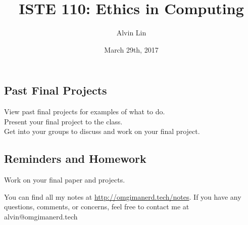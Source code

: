 \documentclass[letterpaper, 12pt]{article}
\title{ISTE 110: Ethics in Computing}
\author{Alvin Lin}
\date{March 29th, 2017}
\begin{document}
\maketitle

\subsection*{Past Final Projects}
View past final projects for examples of what to do. \\
Present your final project to the class. \\
Get into your groups to discuss and work on your final project.

\subsection*{Reminders and Homework}
Work on your final paper and projects.

\begin{center}
  You can find all my notes at \url{http://omgimanerd.tech/notes}. If you have
  any questions, comments, or concerns, feel free to contact me at
  alvin@omgimanerd.tech
\end{center}
\end{document}
